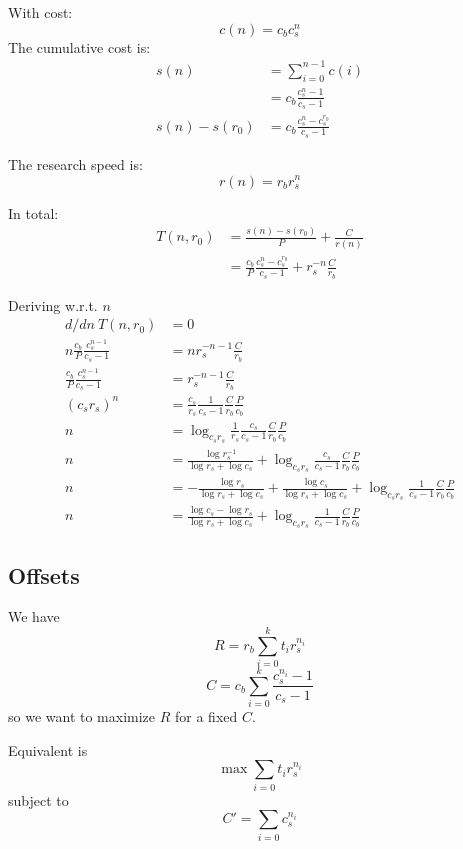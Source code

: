 \documentclass{article}
\begin{document}
With cost:
\[ c(n) = c_b c_s^n \]
The cumulative cost is:
\begin{align*}
    s(n) &= \sum_{i = 0}^{n - 1} c(i) \\
    &= c_b \frac{c_s^n - 1}{c_s - 1} \\
    s(n) - s(r_0) &= c_b\frac{c_s^n - c_s^{r_0}}{c_s - 1}
\end{align*}

The research speed is:
\[ r(n) = r_b r_s^n \]

In total:
\begin{align*}
    T(n, r_0) &= \frac{s(n) - s(r_0)}{P} + \frac{C}{r(n)} \\
    &= \frac{c_b}{P}\frac{c_s^n - c_s^{r_0}}{c_s - 1} + r_s^{-n} \frac{C}{r_b}
\end{align*}

Deriving w.r.t. $n$
\begin{align*}
    d/dn\ T(n,r_0) &= 0 \\
    n\frac{c_b}{P}\frac{c_s^{n - 1}}{c_s - 1} &= n r_s^{-n - 1} \frac{C}{r_b} \\
    \frac{c_b}{P}\frac{c_s^{n - 1}}{c_s - 1} &= r_s^{-n - 1} \frac{C}{r_b} \\
    (c_s r_s)^{n} &= \frac{c_s}{r_s} \frac{1}{c_s - 1} \frac{C}{r_b}\frac{P}{c_b} \\
    n &= \log_{c_s r_s} \frac{1}{r_s} \frac{c_s}{c_s - 1} \frac{C}{r_b}\frac{P}{c_b} \\
    n &= \frac{\log r_s^{-1}}{\log r_s + \log c_s} + \log_{c_s r_s} \frac{c_s}{c_s - 1} \frac{C}{r_b}\frac{P}{c_b} \\
    n &= -\frac{\log r_s}{\log r_s + \log c_s} + \frac{\log c_s}{\log r_s + \log c_s} + \log_{c_s r_s} \frac{1}{c_s - 1} \frac{C}{r_b}\frac{P}{c_b} \\
    n &= \frac{\log c_s - \log r_s}{\log r_s + \log c_s} + \log_{c_s r_s} \frac{1}{c_s - 1} \frac{C}{r_b}\frac{P}{c_b}
\end{align*}



\subsection{Offsets}
We have
\[ R = r_b \sum_{i = 0}^k t_i r_s^{n_i} \]
\[ C = c_b \sum_{i = 0}^k \frac{c_s^{n_i} - 1}{c_s - 1} \]
so we want to maximize $R$ for a fixed $C$.

Equivalent is
\[ \max \sum_{i = 0} t_i r_s^{n_i} \]
subject to
\[ C' = \sum_{i = 0} c_s^{n_i} \]
\end{document}
